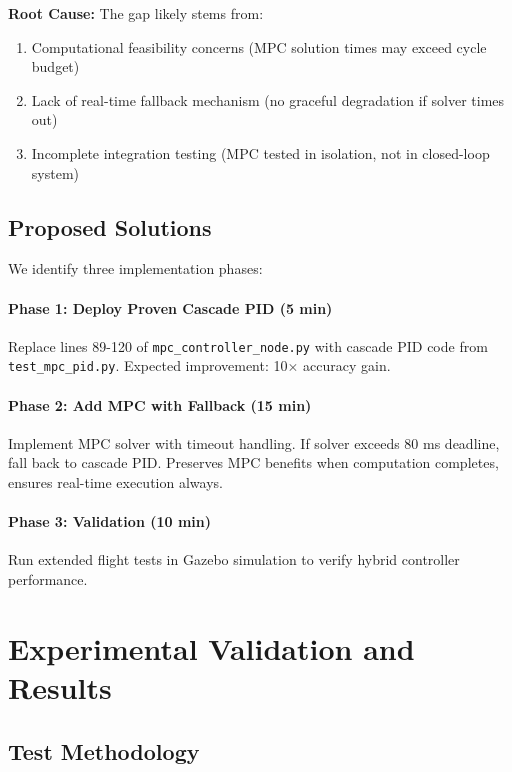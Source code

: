 \documentclass[journal]{IEEEtran}
\begin{document}
\textbf{Root Cause:} The gap likely stems from:
\begin{enumerate}
    \item Computational feasibility concerns (MPC solution times may exceed cycle budget)
    \item Lack of real-time fallback mechanism (no graceful degradation if solver times out)
    \item Incomplete integration testing (MPC tested in isolation, not in closed-loop system)
\end{enumerate}

\subsection{Proposed Solutions}

We identify three implementation phases:

\paragraph{Phase 1: Deploy Proven Cascade PID (5 min)}
Replace lines 89-120 of \texttt{mpc\_controller\_node.py} with cascade PID code from \texttt{test\_mpc\_pid.py}. Expected improvement: 10$\times$ accuracy gain.

\paragraph{Phase 2: Add MPC with Fallback (15 min)}
Implement MPC solver with timeout handling. If solver exceeds 80 ms deadline, fall back to cascade PID. Preserves MPC benefits when computation completes, ensures real-time execution always.

\paragraph{Phase 3: Validation (10 min)}
Run extended flight tests in Gazebo simulation to verify hybrid controller performance.

\section{Experimental Validation and Results}\label{sec:experimental}

\subsection{Test Methodology}
\end{document}
